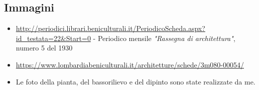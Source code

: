 \documentclass[12pt]{article}
\begin{document}
\subsection{Immagini}
\begin{itemize}
  \item \url{http://periodici.librari.beniculturali.it/PeriodicoScheda.aspx?id\_testata=22\&Start=0} - Periodico mensile \textit{"Rassegna di architettura"}, numero 5 del 1930
  \item \url{https://www.lombardiabeniculturali.it/architetture/schede/3m080-00054/}
  \item Le foto della pianta, del bassorilievo e del dipinto sono state realizzate da me.
\end{itemize}
\end{document}
